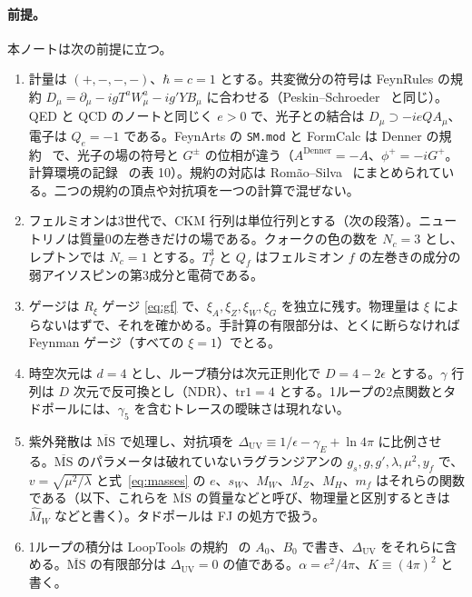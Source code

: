 \documentclass[a4paper,10pt]{ltjsarticle}
\newcommand{\MSbar}{\overline{\mathrm{MS}}}
\newcommand{\DUV}{\Delta_{\mathrm{UV}}}
\newcommand{\tr}{\mathrm{tr}}
\newcommand{\sw}{s_W}
\begin{document}
\paragraph{前提。}本ノートは次の前提に立つ。
\begin{enumerate}
\item 計量は $(+,-,-,-)$、$\hbar=c=1$ とする。共変微分の符号は FeynRules の規約 $D_\mu=\partial_\mu-igT^aW^a_\mu-ig'YB_\mu$ に合わせる（Peskin--Schroeder~\cite{peskin} と同じ）。QED と QCD のノートと同じく $e>0$ で、光子との結合は $D_\mu\supset-ieQA_\mu$、電子は $Q_e=-1$ である。FeynArts の \texttt{SM.mod} と FormCalc は Denner の規約~\cite{denner93} で、光子の場の符号と $G^\pm$ の位相が違う（$A^{\mathrm{Denner}}=-A$、$\phi^+=-iG^+$。計算環境の記録~\cite{env} の表 10）。規約の対応は Romão--Silva~\cite{romao12} にまとめられている。二つの規約の頂点や対抗項を一つの計算で混ぜない。
\item フェルミオンは3世代で、CKM 行列は単位行列とする（次の段落）。ニュートリノは質量0の左巻きだけの場である。クォークの色の数を $N_c=3$ とし、レプトンでは $N_c=1$ とする。$T^3_f$ と $Q_f$ はフェルミオン $f$ の左巻きの成分の弱アイソスピンの第3成分と電荷である。
\item ゲージは $R_\xi$ ゲージ \eqref{eq:gf} で、$\xi_A,\xi_Z,\xi_W,\xi_G$ を独立に残す。物理量は $\xi$ によらないはずで、それを確かめる。手計算の有限部分は、とくに断らなければ Feynman ゲージ（すべての $\xi=1$）でとる。
\item 時空次元は $d=4$ とし、ループ積分は次元正則化で $D=4-2\epsilon$ とする。$\gamma$ 行列は $D$ 次元で反可換とし（NDR）、$\tr1=4$ とする。1ループの2点関数とタドポールには、$\gamma_5$ を含むトレースの曖昧さは現れない。
\item 紫外発散は $\MSbar$ で処理し、対抗項を $\DUV\equiv1/\epsilon-\gamma_E+\ln4\pi$ に比例させる。$\MSbar$ のパラメータは破れていないラグランジアンの $g_s,g,g',\lambda,\mu^2,y_f$ で、$v=\sqrt{\mu^2/\lambda}$ と式~\eqref{eq:masses} の $e$、$\sw$、$M_W$、$M_Z$、$M_H$、$m_f$ はそれらの関数である（以下、これらを $\MSbar$ の質量などと呼び、物理量と区別するときは $\hat M_W$ などと書く）。タドポールは FJ の処方で扱う。
\item 1ループの積分は LoopTools の規約~\cite{looptools} の $A_0$、$B_0$ で書き、$\DUV$ をそれらに含める。$\MSbar$ の有限部分は $\DUV=0$ の値である。$\alpha=e^2/4\pi$、$K\equiv(4\pi)^2$ と書く。

\end{enumerate}
\end{document}

